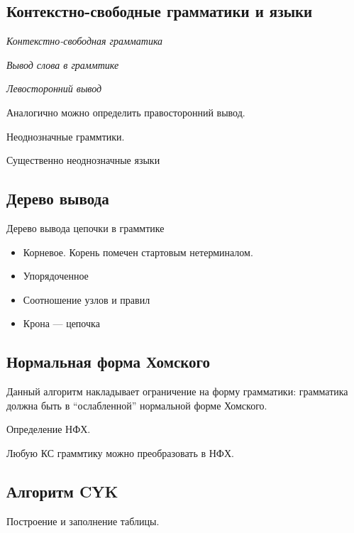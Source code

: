 \subsection{Контекстно-свободные грамматики и языки}



\begin{definition}
\textit{Контекстно-свободная грамматика}
\end{definition}

\begin{definition}
\textit{Вывод слова в граммтике}
\end{definition}

\begin{definition}
\textit{Левосторонний вывод}
\end{definition}

Аналогично можно определить правосторонний вывод.

Неоднозначные граммтики.

Существенно неоднозначные языки


\subsection{Дерево вывода}

Дерево вывода цепочки в граммтике

\begin{itemize}
\item Корневое. Корень помечен стартовым нетерминалом.
\item Упорядоченное
\item Соотношение узлов и правил
\item Крона --- цепочка
\end{itemize}

\subsection{Нормальная форма Хомского}

Данный алгоритм накладывает ограничение на форму грамматики: грамматика должна быть в ``ослабленной'' нормальной форме Хомского.

Определение НФХ.

Любую КС граммтику можно преобразовать в НФХ.

\subsection{Алгоритм CYK}

Построение и заполнение таблицы.
